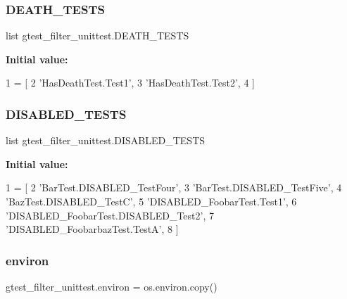 \subsubsection{\texorpdfstring{D\+E\+A\+T\+H\+\_\+\+T\+E\+S\+TS}{DEATH\_TESTS}}
{\footnotesize\ttfamily list gtest\+\_\+filter\+\_\+unittest.\+D\+E\+A\+T\+H\+\_\+\+T\+E\+S\+TS}

{\bfseries Initial value\+:}
\begin{DoxyCode}
1 =  [
2     \textcolor{stringliteral}{'HasDeathTest.Test1'},
3     \textcolor{stringliteral}{'HasDeathTest.Test2'},
4     ]
\end{DoxyCode}
\mbox{\label{namespacegtest__filter__unittest_affe760ab1e8c4c7b61566076c37c1d69}} 
\subsubsection{\texorpdfstring{D\+I\+S\+A\+B\+L\+E\+D\+\_\+\+T\+E\+S\+TS}{DISABLED\_TESTS}}
{\footnotesize\ttfamily list gtest\+\_\+filter\+\_\+unittest.\+D\+I\+S\+A\+B\+L\+E\+D\+\_\+\+T\+E\+S\+TS}

{\bfseries Initial value\+:}
\begin{DoxyCode}
1 =  [
2     \textcolor{stringliteral}{'BarTest.DISABLED\_TestFour'},
3     \textcolor{stringliteral}{'BarTest.DISABLED\_TestFive'},
4     \textcolor{stringliteral}{'BazTest.DISABLED\_TestC'},
5     \textcolor{stringliteral}{'DISABLED\_FoobarTest.Test1'},
6     \textcolor{stringliteral}{'DISABLED\_FoobarTest.DISABLED\_Test2'},
7     \textcolor{stringliteral}{'DISABLED\_FoobarbazTest.TestA'},
8     ]
\end{DoxyCode}
\mbox{\label{namespacegtest__filter__unittest_ab6940a12e110abdd8dea27039f4731ef}} 
\subsubsection{\texorpdfstring{environ}{environ}}
{\footnotesize\ttfamily gtest\+\_\+filter\+\_\+unittest.\+environ = os.\+environ.\+copy()}

